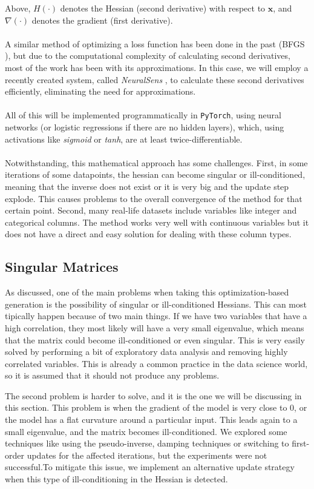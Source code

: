 \documentclass[12pt]{extarticle}
\numberwithin{equation}{section}
\begin{document}
\noindent
Above, $H(\cdot)$ denotes the Hessian (second derivative) with respect to $\mathbf{x}$, 
and $\nabla(\cdot)$ denotes the gradient (first derivative).\\
\\
A similar method of optimizing a loss function has been done in the past (BFGS \cite{papakonstantinou2009historical}), 
but due to the computational complexity of calculating second derivatives, most of the work has been with its approximations. In this case, we will employ a recently created system, called 
\emph{NeuralSens} \cite{neuralsens}, to calculate these second derivatives efficiently, 
eliminating the need for approximations.\\
\\
All of this will be implemented programmatically in \texttt{PyTorch}, using neural networks (or logistic regressions if there are no hidden layers), which, using activations like \emph{sigmoid} or \emph{tanh}, are at least twice-differentiable.\\
\\
Notwithstanding, this mathematical approach has some challenges. 
First, in some iterations of some datapoints, the hessian can become singular or ill-conditioned, meaning that the inverse does not exist or it is very big and the update step explode. This causes problems to the overall convergence of the method for that certain point. 
Second, many real-life datasets include variables like integer and categorical columns. The method works very well with continuous variables but it does not have a direct and easy solution for dealing with these column types.

\subsection{Singular Matrices}
As discussed, one of the main problems when taking this optimization-based generation is the possibility of singular or ill-conditioned Hessians. This can most tipically happen because of two main things. If we have two variables that have a high correlation, they most likely will have a very small eigenvalue, which means that the matrix could become ill-conditioned or even singular. This is very easily solved by performing a bit of exploratory data analysis and removing highly correlated variables. This is already a common practice in the data science world, so it is assumed that it should not produce any problems.

The second problem is harder to solve, and it is the one we will be discussing in this section. This problem is when the gradient of the model is very close to 0, or the model has a flat curvature around a particular input. This leads again to a small eigenvalue, and the matrix becomes ill-conditioned. We explored some techniques like using the pseudo-inverse, damping techniques or switching to first-order updates for the affected iterations, but the experiments were not successful.To mitigate this issue, we implement an alternative update strategy when this type of ill-conditioning in the Hessian is detected. 
\end{document}
